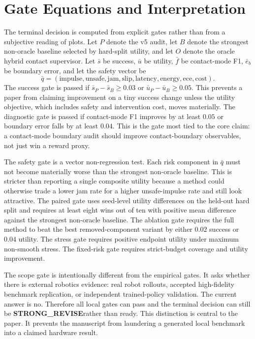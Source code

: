 \documentclass{article}
\newcommand{\terminal}{\textbf{STRONG\_REVISE}}
\begin{document}
\clearpage
\section{Gate Equations and Interpretation}
The terminal decision is computed from explicit gates rather than from a subjective reading of plots. Let $P$ denote the v5 audit, let $B$ denote the strongest non-oracle baseline selected by hard-split utility, and let $O$ denote the oracle hybrid contact supervisor. Let $\bar{s}$ be success, $\bar{u}$ be utility, $\bar{f}$ be contact-mode F1, $\bar{e}_b$ be boundary error, and let the safety vector be
\[
  \bar{q}=(\mathrm{impulse},\mathrm{unsafe},\mathrm{jam},\mathrm{slip},
  \mathrm{latency},\mathrm{energy},\mathrm{ece},\mathrm{cost}).
\]
The success gate is passed if $\bar{s}_P-\bar{s}_B\ge 0.03$ or $\bar{u}_P-\bar{u}_B\ge 0.05$. This prevents a paper from claiming improvement on a tiny success change unless the utility objective, which includes safety and intervention cost, moves materially. The diagnostic gate is passed if contact-mode F1 improves by at least $0.05$ or boundary error falls by at least $0.04$. This is the gate most tied to the core claim: a contact-mode boundary audit should improve contact-boundary observables, not just win a reward proxy.

The safety gate is a vector non-regression test. Each risk component in $\bar{q}$ must not become materially worse than the strongest non-oracle baseline. This is stricter than reporting a single composite utility because a method could otherwise trade a lower jam rate for a higher unsafe-impulse rate and still look attractive. The paired gate uses seed-level utility differences on the held-out hard split and requires at least eight wins out of ten with positive mean difference against the strongest non-oracle baseline. The ablation gate requires the full method to beat the best removed-component variant by either $0.02$ success or $0.04$ utility. The stress gate requires positive endpoint utility under maximum non-smooth stress. The fixed-risk gate requires strict-budget coverage and utility improvement.

The scope gate is intentionally different from the empirical gates. It asks whether there is external robotics evidence: real robot rollouts, accepted high-fidelity benchmark replication, or independent trained-policy validation. The current answer is no. Therefore all local gates can pass and the terminal decision can still be \terminal rather than ready. This distinction is central to the paper. It prevents the manuscript from laundering a generated local benchmark into a claimed hardware result.
\end{document}
